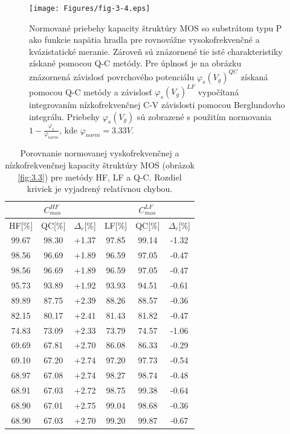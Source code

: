 \begin{figure}[h!]\centering
\texttt{[image: Figures/fig-3-4.eps]}
\captionsetup{justification=raggedright, singlelinecheck=false}
\caption[Normované priebehy kapacity štruktúry MOS so substrátom typu
  P ako funkcie napätia hradla pre rovnovážne vysokofrekvenčné a
  kvázistatické meranie]{Normované priebehy kapacity štruktúry MOS so
  substrátom typu P ako funkcie napätia hradla pre rovnovážne
  vysokofrekvenčné a kvázistatické meranie.  Zároveň sú znázornené tie
  isté charakteristiky získané pomocou Q-C metódy. Pre úplnosť je na
  obrázku znázornená závislosť povrchového potenciálu
  $\varphi_s(V_g)^{QC}$ získaná pomocou Q-C metódy a závislosť
  $\varphi_s(V_g)^{LF}$ vypočítaná integrovaním nízkofrekvenčnej C-V
  závislosti pomocou Berglundovho integrálu.  Priebehy
  $\varphi_s(V_g)$ sú zobrazené s použitím normovania $1 -
  \frac{\varphi_s}{\varphi_{norm}}$, kde $\varphi_{norm}=3.33V$.}
\label{fig:3.4}
\end{figure}

\begin{table}[h!]\centering
\begin{tabular}{|c|c|c||c|c|c|}
  \hline
  \multicolumn{3}{|c||}{$C^{HF}_{mos}$} & \multicolumn{3}{|c|}{$C^{LF}_{mos}$} \\
  \hline
  HF[\%] & QC[\%] & $\Delta_r$[\%] & LF[\%] & QC[\%] & $\Delta_r$[\%] \\
  \hline
  99.67 & 98.30 & +1.37 & 97.85 & 99.14 & -1.32 \\
  98.56 & 96.69 & +1.89 & 96.59 & 97.05 & -0.47 \\
  98.56 & 96.69 & +1.89 & 96.59 & 97.05 & -0.47 \\
  95.73 & 93.89 & +1.92 & 93.93 & 94.51 & -0.61 \\
  89.89 & 87.75 & +2.39 & 88.26 & 88.57 & -0.36 \\
  82.15 & 80.17 & +2.41 & 81.43 & 81.82 & -0.47 \\
  74.83 & 73.09 & +2.33 & 73.79 & 74.57 & -1.06 \\
  69.69 & 67.81 & +2.70 & 86.08 & 86.33 & -0.29 \\
  69.10 & 67.20 & +2.74 & 97.20 & 97.73 & -0.54 \\
  68.97 & 67.08 & +2.74 & 98.27 & 98.74 & -0.48 \\
  68.91 & 67.03 & +2.72 & 98.75 & 99.38 & -0.64 \\
  68.90 & 67.01 & +2.75 & 99.04 & 98.68 & -0.36 \\
  68.90 & 67.03 & +2.70 & 99.20 & 99.87 & -0.67 \\
  \hline
\end{tabular}
\caption[Porovnanie normovanej vyskofrekvenčnej a
  nízkofrekvenčnej kapacity štruktúry MOS (obrázok \ref{fig:3.3}) pre
  metódy HF, LF a Q-C]{Porovnanie normovanej vyskofrekvenčnej a
  nízkofrekvenčnej kapacity štruktúry MOS (obrázok \ref{fig:3.3}) pre
  metódy HF, LF a Q-C. Rozdiel kriviek je vyjadrený relatívnou
  chybou.}
\label{tab:3.1}
\end{table}

